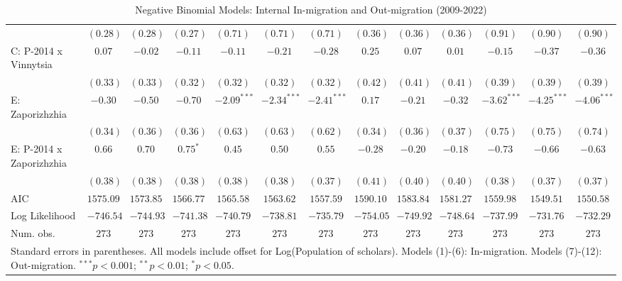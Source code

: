\begin{table}
\begin{center}
\begin{tiny}
\begin{tabular}{l c c c c c c c c c c c c}
                            & $(0.28)$      & $(0.28)$      & $(0.27)$       & $(0.71)$      & $(0.71)$      & $(0.71)$      & $(0.36)$      & $(0.36)$       & $(0.36)$       & $(0.91)$       & $(0.90)$       & $(0.90)$       \\
C: P-2014 x Vinnytsia       & $0.07$        & $-0.02$       & $-0.11$        & $-0.11$       & $-0.21$       & $-0.28$       & $0.25$        & $0.07$         & $0.01$         & $-0.15$        & $-0.37$        & $-0.36$        \\
                            & $(0.33)$      & $(0.33)$      & $(0.32)$       & $(0.32)$      & $(0.32)$      & $(0.32)$      & $(0.42)$      & $(0.41)$       & $(0.41)$       & $(0.39)$       & $(0.39)$       & $(0.39)$       \\
E: Zaporizhzhia             & $-0.30$       & $-0.50$       & $-0.70$        & $-2.09^{***}$ & $-2.34^{***}$ & $-2.41^{***}$ & $0.17$        & $-0.21$        & $-0.32$        & $-3.62^{***}$  & $-4.25^{***}$  & $-4.06^{***}$  \\
                            & $(0.34)$      & $(0.36)$      & $(0.36)$       & $(0.63)$      & $(0.63)$      & $(0.62)$      & $(0.34)$      & $(0.36)$       & $(0.37)$       & $(0.75)$       & $(0.75)$       & $(0.74)$       \\
E: P-2014 x Zaporizhzhia    & $0.66$        & $0.70$        & $0.75^{*}$     & $0.45$        & $0.50$        & $0.55$        & $-0.28$       & $-0.20$        & $-0.18$        & $-0.73$        & $-0.66$        & $-0.63$        \\
                            & $(0.38)$      & $(0.38)$      & $(0.38)$       & $(0.38)$      & $(0.38)$      & $(0.37)$      & $(0.41)$      & $(0.40)$       & $(0.40)$       & $(0.38)$       & $(0.37)$       & $(0.37)$       \\
\hline
AIC                         & $1575.09$     & $1573.85$     & $1566.77$      & $1565.58$     & $1563.62$     & $1557.59$     & $1590.10$     & $1583.84$      & $1581.27$      & $1559.98$      & $1549.51$      & $1550.58$      \\
Log Likelihood              & $-746.54$     & $-744.93$     & $-741.38$      & $-740.79$     & $-738.81$     & $-735.79$     & $-754.05$     & $-749.92$      & $-748.64$      & $-737.99$      & $-731.76$      & $-732.29$      \\
Num. obs.                   & $273$         & $273$         & $273$          & $273$         & $273$         & $273$         & $273$         & $273$          & $273$          & $273$          & $273$          & $273$          \\
\hline
\multicolumn{13}{l}{\tiny{Standard errors in parentheses. All models include offset for Log(Population of scholars). Models (1)-(6): In-migration. Models (7)-(12): Out-migration. $^{***}p<0.001$; $^{**}p<0.01$; $^{*}p<0.05$.}}
\end{tabular}
\end{tiny}
\caption{Negative Binomial Models: Internal In-migration and Out-migration (2009-2022)}
\label{tab:combined_migration}
\end{center}
\end{table}
